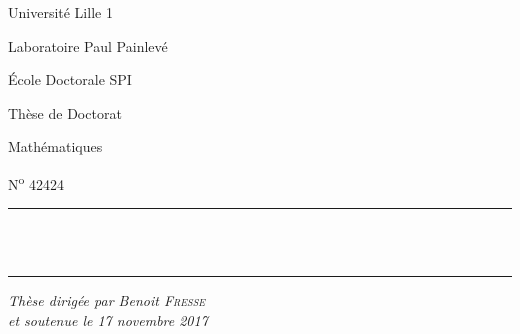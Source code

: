 

\begin{titlepage}
\sffamily
\begin{center}
  \begin{minipage}{0.25\linewidth}
    Université Lille 1

    Laboratoire Paul Painlevé

    École Doctorale SPI
  \end{minipage}%
  \begin{minipage}{0.5\linewidth}
  \end{minipage}%
  \begin{minipage}{0.25\linewidth}
    \raggedleft
    Thèse de Doctorat

    Mathématiques

    N\textsuperscript{o} 42424
  \end{minipage}

  \vspace{3.5cm}

  \rule{\linewidth}{1pt}%
  \\[1\baselineskip]%
  {\bfseries\fontsize{40}{48}\selectfont\mytitle}\\[0.5\baselineskip]%
  \rule{\linewidth}{1pt}

  \vspace{1.5cm}
  {\Huge\myauthor}

  \vspace{3cm}
  \textit{\Large Thèse dirigée par Benoit \textsc{Fresse}\\et soutenue le 17 novembre 2017}
\end{center}


\end{titlepage}
